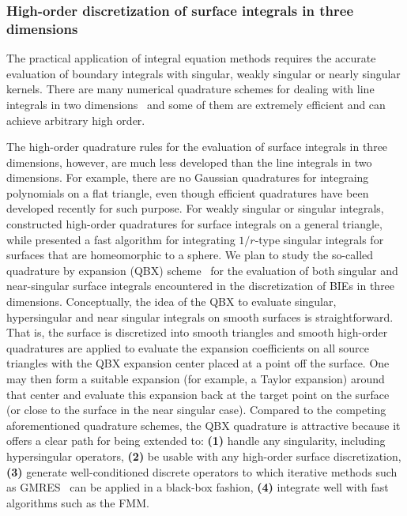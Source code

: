 \subsubsection{High-order discretization of surface integrals in three dimensions}
The practical application of integral equation methods requires the
accurate evaluation of boundary integrals with singular, weakly
singular or nearly singular kernels. There are many numerical quadrature schemes
for dealing with line integrals in two dimensions~\cite{alpert,kapur,sidi,duffy,bruno1,bruno2,davis_1984,graglia_2008,hackbusch_sauter_1994, jarvenpaa_2003,khayat_2005,kress_boundary_1991,schwab_1992, ying_2006,beale1,beale2,goodman_1990, haroldson_1998, lowengrub_1993,schwab_1992,ggq1,ggq2,ggq3,helsing_2008a,helsing_integral_2009,helsing_tutorial_2012}
and some of them are extremely efficient and can achieve arbitrary high order.

The high-order quadrature rules for the evaluation of surface integrals
in three dimensions, however, are much less developed than the line integrals in two
dimensions. For example, there are no Gaussian quadratures for integraing
polynomials on a flat triangle, even though efficient quadratures
\cite{xiao2010cma,vioreanu2014} have been
developed recently for such purpose. For weakly singular or singular integrals,
\cite{bremer2012jcp,bremer2013jcp} constructed high-order quadratures
for surface integrals on a general triangle, while \cite{gimbutas2013sisc}
presented a fast algorithm for integrating $1/r$-type singular integrals
for surfaces that are homeomorphic to a sphere. We plan
to study the so-called quadrature by expansion (QBX) scheme~\cite{klockner2013jcp,qbx2}
for the evaluation
of both singular and near-singular surface integrals encountered in the
discretization of BIEs in three dimensions. Conceptually, the idea of the QBX
to evaluate singular, hypersingular and near singular integrals
on smooth surfaces is straightforward. That is, the surface is discretized
into smooth triangles and smooth high-order quadratures are applied to evaluate
the expansion coefficients
on all source triangles with the QBX expansion center placed at a point off the surface.
One may then form a suitable expansion (for example, a Taylor expansion) around that
center and evaluate this expansion back at the target point on the surface (or close
to the surface in the near singular case). Compared to the competing aforementioned
quadrature schemes, the QBX quadrature is attractive
because it offers a clear path for being extended to: \textbf{(1)}
handle any singularity, including
hypersingular operators, \textbf{(2)} be usable with any high-order surface
discretization, \textbf{(3)} generate well-conditioned discrete
operators to which iterative methods such as GMRES~\cite{gmres} can be
applied in a black-box fashion, \textbf{(4)} integrate well with fast algorithms
such as the FMM. 

